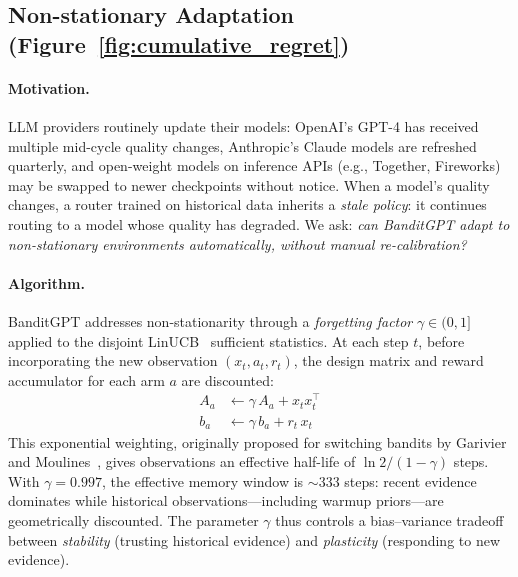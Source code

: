 
\subsection{Non-stationary Adaptation (Figure~\ref{fig:cumulative_regret})}
\label{sec:nonstationarity}

\paragraph{Motivation.}
LLM providers routinely update their models: OpenAI's GPT-4 has
received multiple mid-cycle quality changes, Anthropic's Claude
models are refreshed quarterly, and open-weight models on inference
APIs (e.g., Together, Fireworks) may be swapped to newer
checkpoints without notice.
When a model's quality changes, a router trained on historical data
inherits a \emph{stale policy}: it continues routing to a model
whose quality has degraded.
We ask: \emph{can BanditGPT adapt to non-stationary environments
automatically, without manual re-calibration?}

\paragraph{Algorithm.}
BanditGPT addresses non-stationarity through a \emph{forgetting
factor} $\gamma \in (0, 1]$ applied to the disjoint
LinUCB~\cite{li2010contextual} sufficient statistics.
At each step $t$, before incorporating the new observation
$(x_t, a_t, r_t)$, the design matrix and reward accumulator for
each arm $a$ are discounted:
\begin{align}
    A_a &\leftarrow \gamma \, A_a + x_t x_t^\top
    \label{eq:forget_A} \\
    b_a &\leftarrow \gamma \, b_a + r_t \, x_t
    \label{eq:forget_b}
\end{align}
This exponential weighting, originally proposed for
switching bandits by Garivier and
Moulines~\cite{garivier2011switching}, gives observations an
effective half-life of $\ln 2 / (1 - \gamma)$ steps.
With $\gamma{=}0.997$, the effective memory window is
$\sim\!333$ steps: recent evidence dominates while historical
observations---including warmup priors---are geometrically
discounted.
The parameter $\gamma$ thus controls a
bias--variance tradeoff between \emph{stability} (trusting
historical evidence) and \emph{plasticity} (responding to new
evidence).

